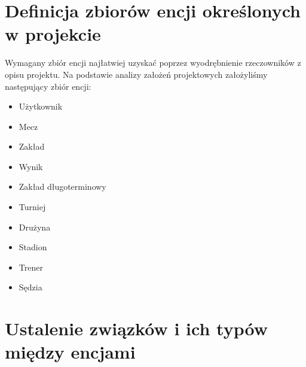 \documentclass{mwrep}[15pt]
\begin{document}
\section{Definicja zbiorów encji określonych w projekcie}
Wymagany zbiór encji najłatwiej uzyskać poprzez wyodrębnienie rzeczowników z opisu projektu.
Na podstawie analizy założeń projektowych założyliśmy następujący zbiór encji:

\begin{itemize}
	\item Użytkownik
	\item Mecz
	\item Zakład
	\item Wynik
	\item Zakład długoterminowy
	\item Turniej
	\item Drużyna
	\item Stadion
	\item Trener
	\item Sędzia
\end{itemize}
 
\vspace{1cm}
\section{Ustalenie związków i ich typów między encjami}
\end{document}
